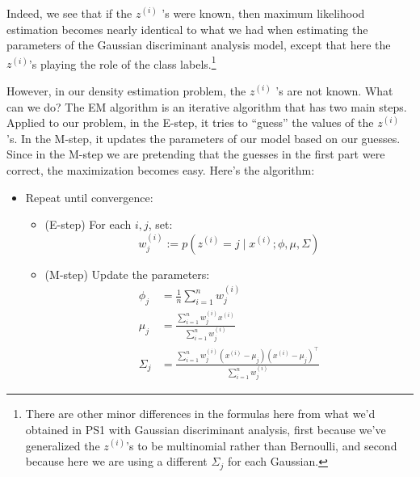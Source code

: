 Indeed, we see that if the $z^{(i)}$ 's were known, then maximum likelihood
estimation becomes nearly identical to what we had when estimating the
parameters of the Gaussian discriminant analysis model, except that here
the $z^{(i)}$'s playing the role of the class labels.\footnote{
There are other minor differences in the formulas here from what we'd obtained in
PS1 with Gaussian discriminant analysis, first because we've generalized the $z^{(i)}$'s to be
multinomial rather than Bernoulli, and second because here we are using a different $\Sigma_j$
for each Gaussian.}

However, in our density estimation problem, the $z^{(i)}$ 's are not known.
What can we do?
The EM algorithm is an iterative algorithm that has two main steps.
Applied to our problem, in the E-step, it tries to ``guess'' the values of the
$z^{(i)}$ 's. In the M-step, it updates the parameters of our model based on our
guesses. Since in the M-step we are pretending that the guesses in the first
part were correct, the maximization becomes easy. Here's the algorithm:
\begin{itemize}
    \item Repeat until convergence:
    \begin{itemize}
        \item (E-step) For each $i,j$, set:
        \begin{equation*}
            w^{(i)}_j := p(z^{(i)} = j \mid x^{(i)} ;\phi,\mu,\Sigma)
        \end{equation*}
        \item (M-step) Update the parameters:
        \begin{align*}
            \phi_j &= \frac{1}{n} \sum_{i=1}^n w^{(i)}_j \\
            \mu_j &= \frac{\sum^n_{i=1} w^{(i)}_j x^{(i)}}{\sum^n_{i=1} w^{(i)}_j }\\
            \Sigma_j &= \frac{\sum^n_{i=1} w^{(i)}_j (x^{(i)} - \mu_j)(x^{(i)} - \mu_j)^\top}{\sum^n_{i=1} w^{(i)}_j }            
        \end{align*}

    \end{itemize}
\end{itemize}

